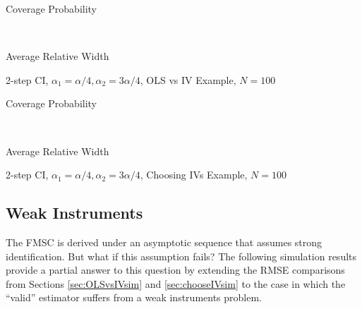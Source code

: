 \begin{table}[h]
  \centering
  \begin{subtable}{0.48\textwidth}
    \caption{Coverage Probability}
    
  \end{subtable}
  ~
  \begin{subtable}{0.48\textwidth}
    \caption{Average Relative Width}
    
  \end{subtable}
  \caption{2-step CI, $\alpha_1 = \alpha/4,\alpha_2 = 3\alpha/4$, OLS vs IV Example, $N=100$}
  \label{tab:CISim100_2stepWideTau_OLSvsIV}
\end{table}

\begin{table}[h]
  \centering
  \begin{subtable}{0.48\textwidth}
    \caption{Coverage Probability}
    
  \end{subtable}
  ~
  \begin{subtable}{0.48\textwidth}
    \caption{Average Relative Width}
    
  \end{subtable}
  \caption{2-step CI, $\alpha_1 = \alpha/4,  \alpha_2 = 3\alpha/4$, Choosing IVs Example, $N=100$}
  \label{tab:CISim100_2stepWideTau_ChooseIVs}
\end{table}

\newpage

\subsection{Weak Instruments} 
The FMSC is derived under an asymptotic sequence that assumes strong identification.
But what if this assumption fails? 
The following simulation results provide a partial answer to this question by extending the RMSE comparisons from Sections \ref{sec:OLSvsIVsim} and \ref{sec:chooseIVsim} to the case in which the ``valid'' estimator suffers from a weak instruments problem.


